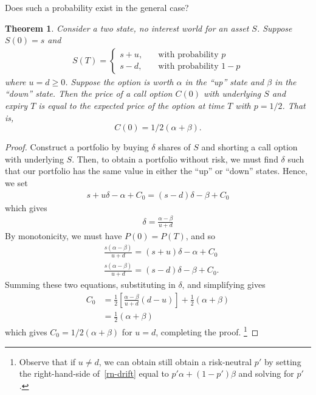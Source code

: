 \documentclass[12pt]{amsbook}
\theoremstyle{plain}
\newtheorem{theorem}{Theorem}
\theoremstyle{definition}
\theoremstyle{remark}
\numberwithin{equation}{section}  %
\begin{document}
Does such a probability exist in the general case?
\begin{theorem}\label{thm:risk-neutral}
	Consider a two state, no interest world for an asset $S$. Suppose $S(0) = s$
	and 
	\begin{equation*}
		\begin{split}
			S(T) = \begin{cases}
				s + u, \quad & \text{with probability }p \\
				s - d, \quad & \text{with probability }1-p
			\end{cases}
		\end{split}
	\end{equation*}
	where $u = d \ge 0$. Suppose the option is worth $\alpha$ in the ``up'' state
	and $\beta$ in the ``down'' state.
	Then the price of a call option $C(0)$ with underlying
	$S$ and expiry $T$ is equal to the expected price of the option at time $T$
	with $p = 1/2$. That is, \[ C(0) = 1/2(\alpha + \beta). \]
\end{theorem}
\begin{proof}
	Construct a portfolio by buying $\delta$
	shares of $S$ and shorting a call option with underlying $S$.
	Then, to obtain a portfolio without risk, we must find $\delta$ such that
	our portfolio has the same value in either the ``up'' or ``down'' states.
	Hence, we set 
	\begin{equation*}
		\begin{split}
			s + u \delta - \alpha + C_{0} = (s - d) \delta - \beta + C_{0}
		\end{split}
	\end{equation*}
	which gives
	\begin{equation*}
		\begin{split}
			\delta = \frac{\alpha - \beta}{u + d}
		\end{split}
	\end{equation*}
	By monotonicity, we must have $P(0) = P(T)$,
	and so
	\begin{equation*}
		\begin{split}
			& \frac{s(\alpha - \beta)}{u + d} = (s + u) \delta - \alpha + C_{0} \\
			& \frac{s(\alpha - \beta)}{u + d} = (s - d) \delta - \beta + C_{0}. 
		\end{split}
	\end{equation*}
	Summing these two equations, substituting in $\delta$, and simplifying gives
	\begin{equation}\label{rn-drift}
		\begin{split}
			C_{0} & =
			\frac{1}{2} \left [ \frac{\alpha - \beta}{u + d} (d - u) \right ]
			+ \frac{1}{2}(\alpha + \beta)
			\\
			& = \frac{1}{2}(\alpha + \beta)
		\end{split}
	\end{equation}
	which gives $C_{0} = 1/2(\alpha + \beta)$ for $u = d$, completing the proof.
	\footnote{Observe that if $u \neq d$, we can obtain still obtain a risk-neutral $p'$
		by setting the right-hand-side of~\eqref{rn-drift} equal to 
	$p' \alpha + (1-p')\beta$ and solving for $p'$.} 
\end{proof}
\end{document}
